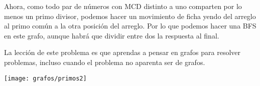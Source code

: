 Ahora, como todo par de números con MCD distinto a uno comparten por lo menos un primo divisor, podemos hacer un movimiento de ficha yendo del arreglo al primo común a la otra posición del arreglo. Por lo que podemos hacer una BFS en este grafo, aunque habrá que dividir entre dos la respuesta al final.

La lección de este problema es que aprendas a pensar en grafos para resolver problemas, incluso cuando el problema no aparenta ser de grafos.	

\begin{center}
	\texttt{[image: grafos/primos2]}
\end{center}